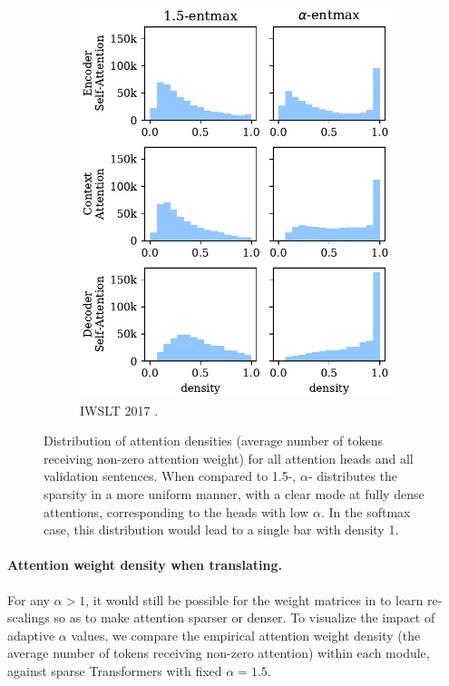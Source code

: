 \begin{figure}[!htbp]
\begin{subfigure}[b]{.49\linewidth}
        \includegraphics[width=\linewidth]{Figures/hist_densities_de.pdf}
        \caption{%
            \label{fig:hist_densities_de}%
            IWSLT 2017 .}
    \end{subfigure}
    \caption{%
        \label{fig:hist_densities}
        Distribution of attention densities (average number of tokens
        receiving non-zero attention weight) for all attention heads and all
        validation sentences.
        When compared to 1.5-\entmaxtext{}, $\alpha$-\entmaxtext{}
        distributes the sparsity in a more uniform manner, with a clear mode
        at fully dense attentions, corresponding to the heads with low
        $\alpha$. In the softmax case, this distribution would lead to a
        single bar with density 1.}
\end{figure}

\paragraph*{Attention weight density when translating.}
For any $\alpha>1$, it would still be possible for the weight
matrices in  to learn re-scalings so as to make
attention sparser or denser. To visualize the impact of adaptive
$\alpha$ values, we compare the empirical attention weight density
(the average number of tokens receiving non-zero attention) within
each module, against sparse Transformers with fixed $\alpha=1.5$.


